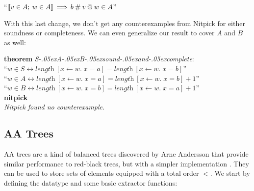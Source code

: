 \documentclass[a4paper,12pt]{article}
\renewcommand\_{\hbox{\textunderscore\kern-.05ex}}
\begin{document}
\prew
``$\mathopen{[\![} v \in A;\> w \in A\mathclose{]\!]} \,\Longrightarrow\, b \mathbin{\#} v \mathbin{@} w \in A$''
\postw

With this last change, we don't get any counterexamples from Nitpick for either
soundness or completeness. We can even generalize our result to cover $A$ and
$B$ as well:

\prew
\textbf{theorem} \textit{S\_A\_B\_sound\_and\_complete}: \\
``$w \in S \longleftrightarrow \textit{length}~[x \mathbin{\leftarrow} w.\; x = a] = \textit{length}~[x \mathbin{\leftarrow} w.\; x = b]$'' \\
``$w \in A \longleftrightarrow \textit{length}~[x \mathbin{\leftarrow} w.\; x = a] = \textit{length}~[x \mathbin{\leftarrow} w.\; x = b] + 1$'' \\
``$w \in B \longleftrightarrow \textit{length}~[x \mathbin{\leftarrow} w.\; x = b] = \textit{length}~[x \mathbin{\leftarrow} w.\; x = a] + 1$'' \\
\textbf{nitpick} \\[2\smallskipamount]
\slshape Nitpick found no counterexample.
\postw

\subsection{AA Trees}
\label{aa-trees}

AA trees are a kind of balanced trees discovered by Arne Andersson that provide
similar performance to red-black trees, but with a simpler implementation
\cite{andersson-1993}. They can be used to store sets of elements equipped with
a total order $<$. We start by defining the datatype and some basic extractor
functions:
\end{document}
